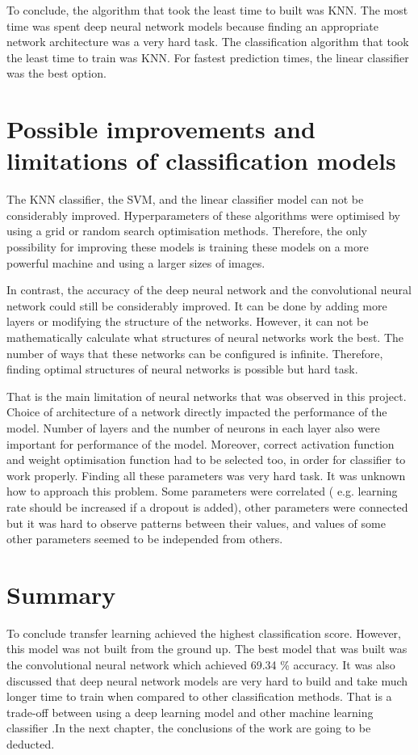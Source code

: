 To conclude, the algorithm that took the least time to built was KNN. The most time was spent deep neural network models because finding an appropriate network architecture was a very hard task. The classification algorithm that took the least time to train was KNN. For fastest prediction times, the linear classifier was the best option.

\section{Possible improvements and limitations of classification models}

The KNN classifier, the SVM,  and the linear classifier model can not be considerably improved.  Hyperparameters of these algorithms were optimised by using a grid or random search optimisation methods. Therefore, the only possibility for improving these models is training these models on a more powerful machine and  using  a larger sizes of  images.

In contrast,  the accuracy of the deep neural network and the convolutional neural network could still be considerably improved. It can be done by adding more layers or modifying the structure of the networks. However, it can not be mathematically calculate what structures of neural networks work the best. The number of ways that these networks can be configured is infinite. Therefore, finding optimal structures of neural networks is possible but hard task.

That is the main limitation of neural networks that was observed in this project. Choice of  architecture of a network directly impacted the performance of the model. Number of layers and the number of neurons in each layer also were important for performance of the model. Moreover, correct activation function and weight optimisation function had to be selected too, in order for classifier to work properly. Finding all these parameters was very hard task. It was unknown how to approach this problem. Some parameters were correlated ( e.g. learning rate should be increased if a dropout is added), other parameters were connected but it was hard to observe patterns between their values, and values of some other parameters seemed to be independed from others. 

\section{Summary}

To conclude transfer learning achieved the highest classification score. However, this model was not built from the ground up. The best model that was built was the convolutional neural network which achieved 69.34 \% accuracy.  It was also discussed that deep neural network models are very hard to build and take much longer time to train when compared to other classification methods. That is a trade-off between using a deep learning model and other machine learning classifier .In the next chapter, the conclusions of the work are going to be deducted.
